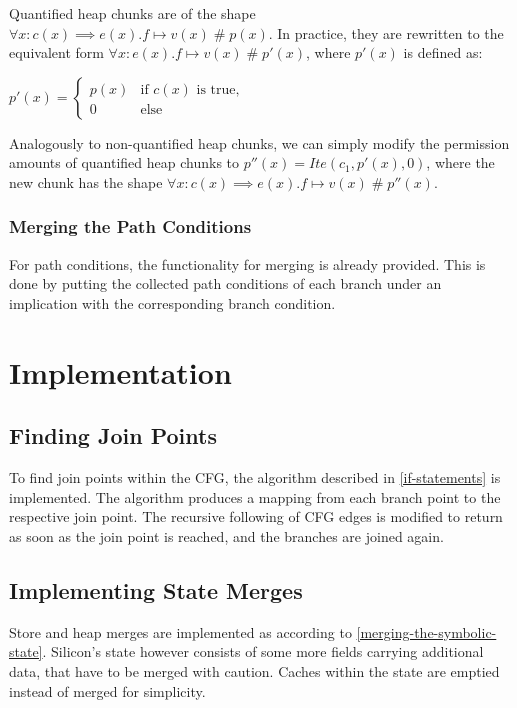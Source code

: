 \documentclass[11pt]{article}
\DeclareMathOperator{\perm}{\mathbin{\#}}
\begin{document}
    Quantified heap chunks are of the shape $\forall x: c(x) \implies e(x).f \mapsto v(x) \perm p(x)$.
    In practice, they are rewritten to the equivalent form $\forall x: e(x).f \mapsto v(x) \perm p'(x)$,
    where $p'(x)$ is defined as:

    \begin{math}
        p'(x) = \begin{cases}
            p(x) & \text{if } c(x) \text{ is true,} \\
            0 & \text{else}
        \end{cases}
    \end{math}

    Analogously to non-quantified heap chunks, we can simply modify the permission amounts of
    quantified heap chunks to $p''(x) = Ite(c_1, p'(x), 0)$, where the new chunk has the shape
    $\forall x: c(x) \implies e(x).f \mapsto v(x) \perm p''(x)$.

    \subsubsection{Merging the Path Conditions}

    For path conditions, the functionality for merging is already provided.
    This is done by putting the collected path conditions of each branch
    under an implication with the corresponding branch condition.

    \newpage
    \section{Implementation}

    \subsection{Finding Join Points}

    To find join points within the CFG, the algorithm described in \ref{if-statements} is implemented.
    The algorithm produces a mapping from each branch point to the respective join point. The recursive following of
    CFG edges is modified to return as soon as the join point is reached, and the branches are joined again.

    \subsection{Implementing State Merges}

    Store and heap merges are implemented as according to \ref{merging-the-symbolic-state}.
    Silicon's state however consists of some more fields carrying additional data, that have to be merged with caution.
    Caches within the state are emptied instead of merged for simplicity.
\end{document}
